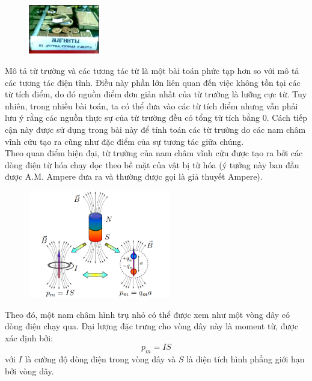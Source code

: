 \begin{figure}
  \centering
  \vspace{-0.55cm}
  \includegraphics[width=0.275\textwidth]{Figures/Problems/Fig 2.1.png}
\end{figure}
\noindent Mô tả từ trường và các tương tác từ là một bài toán phức tạp hơn so với mô tả các tương tác điện tĩnh. Điều này phần lớn liên quan đến việc không tồn tại các từ tích điểm, do đó nguồn điểm đơn giản nhất của từ trường là lưỡng cực từ. Tuy nhiên, trong nhiều bài toán, ta có thể đưa vào các từ tích điểm nhưng vẫn phải lưu ý rằng các nguồn thực sự của từ trường đều có tổng từ tích bằng 0. Cách tiếp cận này được sử dụng trong bài này để tính toán các từ trường do các nam châm vĩnh cửu tạo ra cũng như đặc điểm của sự tương tác giữa chúng.\\
\indent Theo quan điểm hiện đại, từ trường của nam châm vĩnh cửu được tạo ra bởi các dòng điện từ hóa chạy dọc theo bề mặt của vật bị từ hóa (ý tưởng này ban đầu được A.M. Ampere đưa ra và thường được gọi là giả thuyết Ampere).\\
\begin{figure}[H]
  \centering
  \includegraphics[width=0.55\textwidth]{Figures/Problems/Fig 2.2.png}
\end{figure}
\vspace{-0.4cm}
\noindent Theo đó, một nam châm hình trụ nhỏ có thể được xem như một vòng dây có dòng điện chạy qua. Đại lượng đặc trưng cho vòng dây này là moment từ, được xác định bởi:
\begin{equation*}
  p_m = IS
\end{equation*}
với $I$ là cường độ dòng điện trong vòng dây và $S$ là diện tích hình phẳng giới hạn bởi vòng dây.\\
